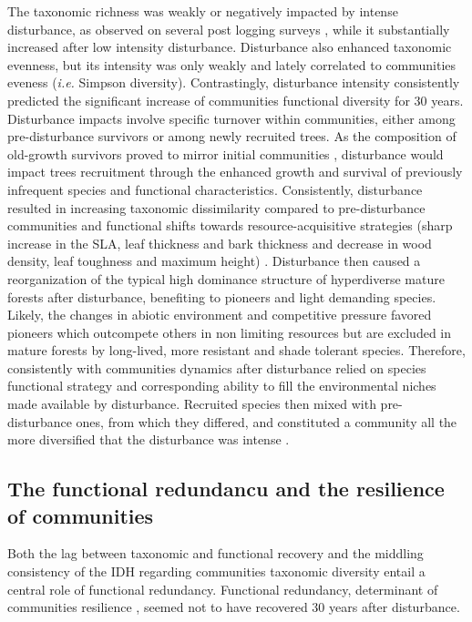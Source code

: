 \documentclass[fleqn,10pt]{ArtEcoFoG} %
\theoremstyle{definition}
\theoremstyle{definition}
\theoremstyle{definition}
\theoremstyle{remark}
\begin{document}
The taxonomic richness was weakly or negatively impacted by intense
disturbance, as observed on several post logging surveys
\citep{Cannon1998, Baraloto2012a}, while it substantially increased
after low intensity disturbance. Disturbance also enhanced taxonomic
evenness, but its intensity was only weakly and lately correlated to
communities eveness (\emph{i.e.} Simpson diversity). Contrastingly,
disturbance intensity consistently predicted the significant increase of
communities functional diversity for 30 years. Disturbance impacts
involve specific turnover within communities, either among
pre-disturbance survivors or among newly recruited trees. As the
composition of old-growth survivors proved to mirror initial communities
\citep{Herault2018}, disturbance would impact trees recruitment through
the enhanced growth and survival of previously infrequent species and
functional characteristics. Consistently, disturbance resulted in
increasing taxonomic dissimilarity compared to pre-disturbance
communities and functional shifts towards resource-acquisitive
strategies (sharp increase in the SLA, leaf thickness and bark thickness
and decrease in wood density, leaf toughness and maximum height)
\citep{Westoby1998, Wright2004, Reich2014}. Disturbance then caused a
reorganization of the typical high dominance structure of hyperdiverse
mature forests after disturbance, benefiting to pioneers and light
demanding species. Likely, the changes in abiotic environment and
competitive pressure favored pioneers which outcompete others in non
limiting resources but are excluded in mature forests by long-lived,
more resistant and shade tolerant species. Therefore, consistently with
communities dynamics after disturbance relied on species functional
strategy and corresponding ability to fill the environmental niches made
available by disturbance. Recruited species then mixed with
pre-disturbance ones, from which they differed, and constituted a
community all the more diversified that the disturbance was intense
\citep{Molino2001}.

\subsection{The functional redundancu and the resilience of
communities}\label{the-functional-redundancu-and-the-resilience-of-communities}

Both the lag between taxonomic and functional recovery and the middling
consistency of the IDH regarding communities taxonomic diversity entail
a central role of functional redundancy. Functional redundancy,
determinant of communities resilience
\citep{Trenbath1999, Elmqvist2003, Diaz2005}, seemed not to have
recovered 30 years after disturbance.
\end{document}

